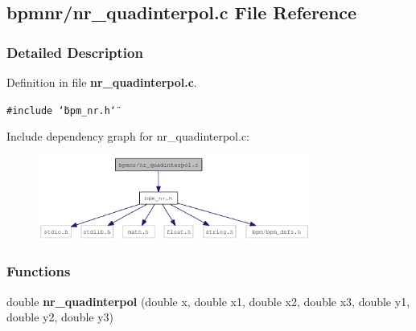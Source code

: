 \subsection{bpmnr/nr\_\-quadinterpol.c File Reference}
\label{nr__quadinterpol_8c}


\subsubsection{Detailed Description}


Definition in file {\bf nr\_\-quadinterpol.c}.

{\tt \#include \char`\"{}bpm\_\-nr.h\char`\"{}}\par


Include dependency graph for nr\_\-quadinterpol.c:\nopagebreak
\begin{figure}[H]
\begin{center}
\leavevmode
\includegraphics[width=253pt]{nr__quadinterpol_8c__incl}
\end{center}
\end{figure}
\subsubsection*{Functions}
\begin{CompactItemize}
\item 
double {\bf nr\_\-quadinterpol} (double x, double x1, double x2, double x3, double y1, double y2, double y3)
\end{CompactItemize}
